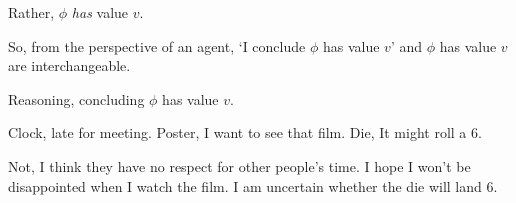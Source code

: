 \begin{note}[`Concluding']
  Rather, \(\phi\) \emph{has} value \(v\).

  So, from the perspective of an agent, `I conclude \(\phi\) has value \(v\)' and \(\phi\) has value \(v\) are interchangeable.
\end{note}

\begin{note}
  Reasoning, concluding \(\phi\) has value \(v\).

  Clock, late for meeting.
  Poster, I want to see that film.
  Die, It might roll a 6.

  Not, I think they have no respect for other people's time.
  I hope I won't be disappointed when I watch the film.
  I am uncertain whether the die will land 6.
\end{note}

